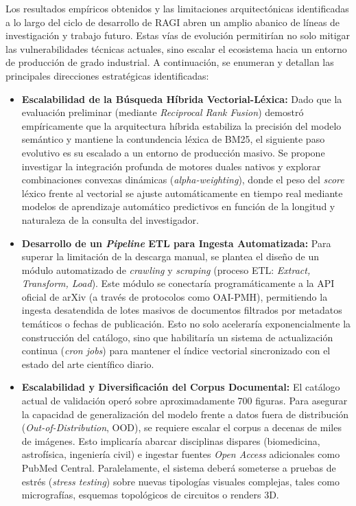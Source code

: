 \documentclass[a4paper]{report}
\begin{document}
\endgroup

Los resultados empíricos obtenidos y las limitaciones arquitectónicas identificadas a lo largo del ciclo de desarrollo de RAGI abren un amplio abanico de líneas de investigación y trabajo futuro. Estas vías de evolución permitirían no solo mitigar las vulnerabilidades técnicas actuales, sino escalar el ecosistema hacia un entorno de producción de grado industrial. A continuación, se enumeran y detallan las principales direcciones estratégicas identificadas:

\begin{itemize}
    \item \textbf{Escalabilidad de la Búsqueda Híbrida Vectorial-Léxica:} Dado que la evaluación preliminar (mediante \textit{Reciprocal Rank Fusion}) demostró empíricamente que la arquitectura híbrida estabiliza la precisión del modelo semántico y mantiene la contundencia léxica de BM25, el siguiente paso evolutivo es su escalado a un entorno de producción masivo. Se propone investigar la integración profunda de motores duales nativos y explorar combinaciones convexas dinámicas (\textit{alpha-weighting}), donde el peso del \textit{score} léxico frente al vectorial se ajuste automáticamente en tiempo real mediante modelos de aprendizaje automático predictivos en función de la longitud y naturaleza de la consulta del investigador.

    \item \textbf{Desarrollo de un \textit{Pipeline} ETL para Ingesta Automatizada:} Para superar la limitación de la descarga manual, se plantea el diseño de un módulo automatizado de \textit{crawling} y \textit{scraping} (proceso ETL: \textit{Extract, Transform, Load}). Este módulo se conectaría programáticamente a la API oficial de arXiv (a través de protocolos como OAI-PMH), permitiendo la ingesta desatendida de lotes masivos de documentos filtrados por metadatos temáticos o fechas de publicación. Esto no solo aceleraría exponencialmente la construcción del catálogo, sino que habilitaría un sistema de actualización continua (\textit{cron jobs}) para mantener el índice vectorial sincronizado con el estado del arte científico diario.

    \item \textbf{Escalabilidad y Diversificación del Corpus Documental:} El catálogo actual de validación operó sobre aproximadamente 700 figuras. Para asegurar la capacidad de generalización del modelo frente a datos fuera de distribución (\textit{Out-of-Distribution}, OOD), se requiere escalar el corpus a decenas de miles de imágenes. Esto implicaría abarcar disciplinas dispares (biomedicina, astrofísica, ingeniería civil) e ingestar fuentes \textit{Open Access} adicionales como PubMed Central. Paralelamente, el sistema deberá someterse a pruebas de estrés (\textit{stress testing}) sobre nuevas tipologías visuales complejas, tales como micrografías, esquemas topológicos de circuitos o renders 3D.


\end{itemize}
\end{document}

